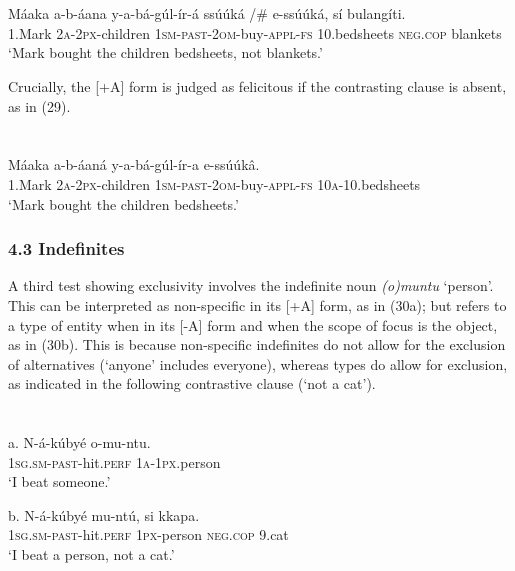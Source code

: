 \documentclass[output=paper]{langsci/langscibook}
\begin{document}
\chapter{}
\gll   Máaka  a-b-áana    y-a-bá-gúl-ír-á        ssúúká /\# e-ssúúká,  sí    bulangíti.\\
       1.Mark  \textsc{2a}{}-\textsc{2px}{}-children  \textsc{1sm}{}-\textsc{past}{}-\textsc{2om}{}-buy-\textsc{appl}{}-\textsc{fs}  10.bedsheets     \textsc{neg}.\textsc{cop}  blankets\\
    ‘Mark bought the children bedsheets, not blankets.’

Crucially, the [+A] form is judged as felicitous if the contrasting clause is absent, as in (29).

\chapter[  ]{  }
\gll   Máaka  a-b-áaná    y-a-bá-gúl-ír-a      e-ssúúkâ.\\
       1.Mark  \textsc{2a}{}-\textsc{2px}{}-children  \textsc{1sm}{}-\textsc{past}{}-\textsc{2om}{}-buy-\textsc{appl}{}-\textsc{fs}  \textsc{10a}{}-10.bedsheets\\
\glt   ‘Mark bought the children bedsheets.’
\z

\subsection{ 4.3 Indefinites}

A third test showing exclusivity involves the indefinite noun \textit{(o)muntu} ‘person’. This can be interpreted as non-specific in its [+A] form, as in (30a); but refers to a type of entity when in its [-A] form and when the scope of focus is the object, as in (30b). This is because non-specific indefinites do not allow for the exclusion of alternatives (‘anyone’ includes everyone), whereas types do allow for exclusion, as indicated in the following contrastive clause (‘not a cat’).

\chapter[  ]{  }
\gll   a.  N-á-kúbyé      o-mu-ntu.\\
         \textsc{1sg}.\textsc{sm}{}-\textsc{past}{}-hit.\textsc{perf}  \textsc{1a}{}-\textsc{1px}.person\\
\glt     ‘I beat someone.’
\z

\gll   b.  N-á-kúbyé      mu-ntú,  si    kkapa.\\
         \textsc{1sg}.\textsc{sm}{}-\textsc{past}{}-hit.\textsc{perf}  \textsc{1px}{}-person  \textsc{neg.cop}  9.cat\\
\glt     ‘I beat a person, not a cat.’
\z
\end{document}
